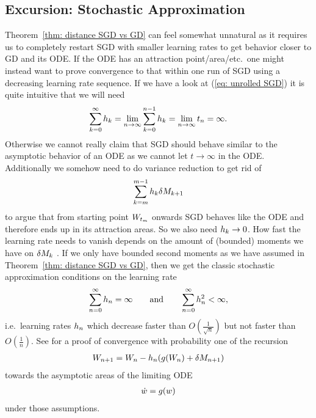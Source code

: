 \subsection{Excursion: Stochastic Approximation}

Theorem~\ref{thm: distance SGD vs GD} can feel somewhat unnatural as it requires
us to completely restart SGD with smaller learning rates to get behavior closer
to GD and its ODE. If the ODE has an attraction point/area/etc.\ one might
instead want to prove convergence to that within one run of SGD using a
decreasing learning rate sequence. If we have a look at (\ref{eq: unrolled SGD})
it is quite intuitive that we will need
\begin{align*}
	\sum_{k=0}^\infty h_k = \lim_{n\to\infty}\sum_{k=0}^{n-1} h_k
	= \lim_{n\to\infty}t_n = \infty.
\end{align*}
Otherwise we cannot really claim that SGD should behave similar to the asymptotic
behavior of an ODE as we cannot let \(t\to\infty\) in the ODE. Additionally
we somehow need to do variance reduction to get rid of
\begin{align*}
	\sum_{k=m}^{m-1} h_k\delta M_{k+1}
\end{align*}
to argue that from starting point \(W_{t_m}\) onwards SGD behaves like the ODE
and therefore ends up in its attraction areas. So we also need
\(h_k \to 0\). How fast the learning rate needs to vanish depends on the
amount of (bounded) moments we have on \(\delta M_k\) \parencite[p.
110]{kushnerStochasticApproximationAlgorithms1997}.
If we only have bounded second moments as we have assumed in Theorem~\ref{thm:
distance SGD vs GD}, then we get the classic stochastic approximation conditions
on the learning rate
\begin{align*}
	\sum_{n=0}^\infty h_n = \infty \qquad \text{and} \qquad \sum_{n=0}^\infty h_n^2 <\infty,
\end{align*}
i.e.\ learning rates \(h_n\) which decrease faster than \(O(\frac1{ \sqrt{n} })\) but
not faster than \(O(\frac1n)\). See \textcite[ch.
5]{kushnerStochasticApproximationAlgorithms1997} for a proof of
convergence with probability one of the recursion
\begin{align*}
	W_{n+1} = W_n - h_n(g(W_n) + \delta M_{n+1})
\end{align*}
towards the asymptotic areas of the limiting
ODE
\begin{align*}
	\dot{w} = g(w)
\end{align*}
under those assumptions.

